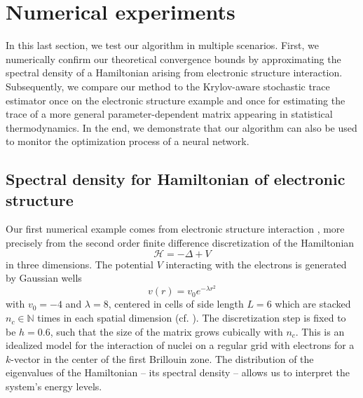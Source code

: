 
\section{Numerical experiments}
\label{sec:results}

In this last section, we test our algorithm in multiple scenarios. First, we numerically confirm our theoretical convergence bounds by approximating the spectral density of a Hamiltonian arising from electronic structure interaction. Subsequently, we compare our method to the Krylov-aware stochastic trace estimator \cite{chen-2023-krylovaware-stochastic} once on the electronic structure example and once for estimating the trace of a more general parameter-dependent matrix appearing in statistical thermodynamics. In the end, we demonstrate that our algorithm can also be used to monitor the optimization process of a neural network.

\subsection{Spectral density for Hamiltonian of electronic structure}
\label{subsec:hamiltonian}

Our first numerical example comes from electronic structure interaction \cite{lin-2017-randomized-estimation}, more precisely from the second order finite difference discretization of the Hamiltonian
\begin{equation}
    \mathcal{H} = - \Delta + V
    \label{equ:5-experiments-electronic-hamiltonian}
\end{equation}
in three dimensions. The potential $V$ interacting with the electrons is generated by Gaussian wells
\begin{equation}
    v(r) = v_0 e^{-\lambda r^2}
    \label{equ:5-experiments-gaussian-cell}
\end{equation}
with $v_0 = -4$ and $\lambda = 8$, centered in cells of side length $L=6$ which are stacked $n_c \in \mathbb{N}$ times in each spatial dimension (cf. ). The discretization step is fixed to be $h=0.6$, such that the size of the matrix grows cubically with $n_c$. This is an idealized model for the interaction of nuclei on a regular grid with electrons for a $k$-vector in the center of the first Brillouin zone. The distribution of the eigenvalues of the Hamiltonian -- its spectral density -- allows us to interpret the system's energy levels.

